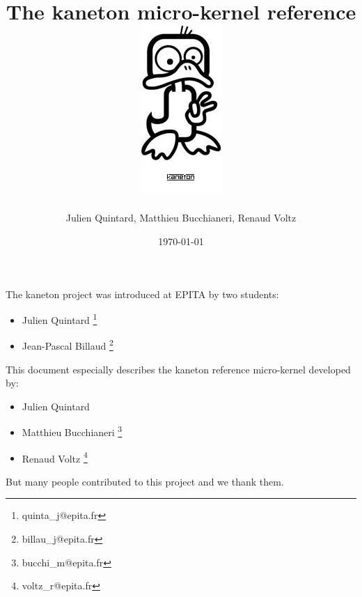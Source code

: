 \documentclass[12pt,a4wide]{report}
\date{\scriptsize{\today}}
\title{\huge{The kaneton micro-kernel reference}
\\\vspace{2cm}\includegraphics{../../logos/logo.jpg}}
\author{\small{Julien Quintard}, \small{Matthieu Bucchianeri},
\small{Renaud Voltz}\vspace{2cm}}
\newcommand{\kaneton}{kaneton\xspace}
\begin{document}
%
%

\maketitle

%
%

%
%

\newpage


The \kaneton project was introduced at EPITA by two students:

\begin{itemize}
\item Julien Quintard \footnote{quinta\_j@epita.fr}
\item Jean-Pascal Billaud \footnote{billau\_j@epita.fr}
\end{itemize}


This document especially describes the kaneton reference micro-kernel
developed by:

\begin{itemize}
\item Julien Quintard
\item Matthieu Bucchianeri \footnote{bucchi\_m@epita.fr}
\item Renaud Voltz \footnote{voltz\_r@epita.fr}
\end{itemize}


But many people contributed to this project and we thank them.

%
%

\tableofcontents

%
%











%
%
\end{document}

